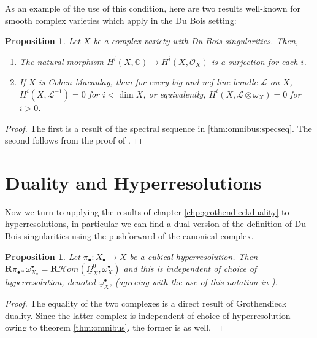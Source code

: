 \documentclass[proquest]{uwthesis}[2014/11/13]
\newtheorem{prop}[theorem]{Proposition}
\theoremstyle{definition}
\newcommand{\cHom}{\mathcal{H} \textit{om}}
\newcommand{\CC}{\mathbb{C}}
\newcommand{\LL}{\mathcal{L}}
\newcommand{\OO}{\mathcal{O}}
\newcommand{\bR}{\textbf{R}}
\newcommand{\DB}{\underline{\Omega}}
\newcommand{\db}{\underline{\omega}^\bullet}
\begin{document}
As an example of the use of this condition, here are two results well-known for smooth complex varieties which apply in the Du Bois setting:

\begin{prop}
	Let $X$ be a complex variety with Du Bois singularities.
	Then,
	\begin{enumerate}
		\item The natural morphism $H^i(X, \CC) \rightarrow H^i(X, \OO_X)$ is a surjection for each $i$.
		\item If $X$ is Cohen-Macaulay, than for every big and nef line bundle $\LL$ on $X$, $H^i(X, \LL^{-1}) = 0$ for $i < \dim X$, or equivalently, $H^i(X, \LL \otimes \omega_X) = 0$ for $i > 0$.
	\end{enumerate}
\end{prop}
\begin{proof}
	The first is a result of the spectral sequence in \ref{thm:omnibus:specseq}.
	The second follows from the proof of \cite[6.6]{Kovacs2010}.
\end{proof}

\section{Duality and Hyperresolutions}
Now we turn to applying the results of chapter \ref{chp:grothendieckduality} to hyperresolutions, in particular we can find a dual version of the definition of Du Bois singularities using the pushforward of the canonical complex.

\begin{prop}
	Let $\pi_\bullet : X_\bullet \rightarrow X$ be a cubical hyperresolution.
	Then $\bR \pi_{\bullet *} \omega_{X_\bullet}^\bullet = \bR \cHom(\DB_X^0,\omega_X^\bullet)$ and this is independent of choice of hyperresolution, denoted $\db_X$, (agreeing with the use of this notation in \cite{Kovacs2011a}).
\end{prop}
\begin{proof}
	The equality of the two complexes is a direct result of Grothendieck duality.
	Since the latter complex is independent of choice of hyperresolution owing to theorem \ref{thm:omnibus}, the former is as well.
\end{proof}
\end{document}
